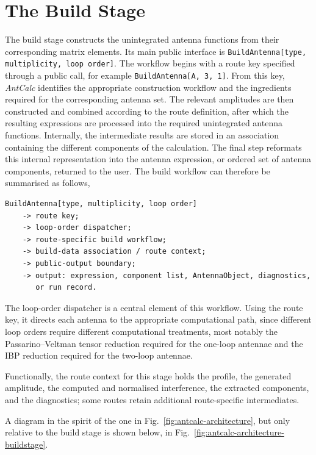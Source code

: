 \section{The Build Stage}\label{sec:buildStage}

The build stage constructs the unintegrated antenna functions from their corresponding matrix
elements. Its main public interface is
\texttt{BuildAntenna[type, multiplicity, loop order]}. The workflow begins with a route key
specified through a public call, for example \texttt{BuildAntenna[A, 3, 1]}. From this key,
\textit{AntCalc} identifies the appropriate construction workflow and the ingredients required
for the corresponding antenna set. The relevant amplitudes are then constructed and combined
according to the route definition, after which the resulting expressions are processed into the
required unintegrated antenna functions. Internally, the intermediate results are stored in an
association containing the different components of the calculation. The final step reformats
this internal representation into the antenna expression, or ordered set of antenna components,
returned to the user. The build workflow can therefore be summarised as follows,

\begin{mdframed}[backgroundcolor=gray!10, linewidth=0pt]
\begin{lstlisting}
BuildAntenna[type, multiplicity, loop order]
    -> route key;
    -> loop-order dispatcher;
    -> route-specific build workflow;
    -> build-data association / route context;
    -> public-output boundary;
    -> output: expression, component list, AntennaObject, diagnostics, 
       or run record.
\end{lstlisting}
\end{mdframed}

The loop-order dispatcher is a central element of this workflow. Using the route key, it
directs each antenna to the appropriate computational path, since different loop orders
require different computational treatments, most notably the Passarino--Veltman tensor reduction required for the one-loop antennae and the IBP reduction required for the two-loop antennae.

Functionally, the route context for this stage holds the profile, the generated amplitude, the
computed and normalised interference, the extracted components, and the diagnostics; some routes
retain additional route-specific intermediates.

A diagram in the spirit of the one in Fig.~\ref{fig:antcalc-architecture}, but only relative to 
the build stage is shown below, in Fig.~\ref{fig:antcalc-architecture-buildstage}.

